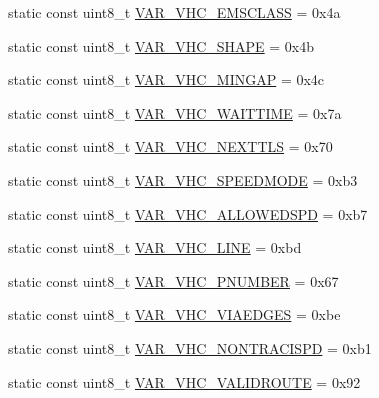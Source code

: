 \begin{DoxyCompactItemize}
\item 
static const uint8\+\_\+t \hyperlink{classtraci__api_1_1_vehicle_manager_a26f3f016ee48aa4f004058253c0699ff}{V\+A\+R\+\_\+\+V\+H\+C\+\_\+\+E\+M\+S\+C\+L\+A\+SS} = 0x4a
\item 
static const uint8\+\_\+t \hyperlink{classtraci__api_1_1_vehicle_manager_a1f99a485df0336dc0be888fe59b1431a}{V\+A\+R\+\_\+\+V\+H\+C\+\_\+\+S\+H\+A\+PE} = 0x4b
\item 
static const uint8\+\_\+t \hyperlink{classtraci__api_1_1_vehicle_manager_ad4456bf8a1da769c826274acb2af6fe9}{V\+A\+R\+\_\+\+V\+H\+C\+\_\+\+M\+I\+N\+G\+AP} = 0x4c
\item 
static const uint8\+\_\+t \hyperlink{classtraci__api_1_1_vehicle_manager_a12d27b67a1efc5a300aa7baed5cdc473}{V\+A\+R\+\_\+\+V\+H\+C\+\_\+\+W\+A\+I\+T\+T\+I\+ME} = 0x7a
\item 
static const uint8\+\_\+t \hyperlink{classtraci__api_1_1_vehicle_manager_a2c78dc01c5fdad2afb13f7f449e36813}{V\+A\+R\+\_\+\+V\+H\+C\+\_\+\+N\+E\+X\+T\+T\+LS} = 0x70
\item 
static const uint8\+\_\+t \hyperlink{classtraci__api_1_1_vehicle_manager_a240c2aecbbf2dd8e024952eae3b79365}{V\+A\+R\+\_\+\+V\+H\+C\+\_\+\+S\+P\+E\+E\+D\+M\+O\+DE} = 0xb3
\item 
static const uint8\+\_\+t \hyperlink{classtraci__api_1_1_vehicle_manager_a726376cb977fae009eca00f5550980ae}{V\+A\+R\+\_\+\+V\+H\+C\+\_\+\+A\+L\+L\+O\+W\+E\+D\+S\+PD} = 0xb7
\item 
static const uint8\+\_\+t \hyperlink{classtraci__api_1_1_vehicle_manager_a226d8c4d5cffe0ce33f5041380589c09}{V\+A\+R\+\_\+\+V\+H\+C\+\_\+\+L\+I\+NE} = 0xbd
\item 
static const uint8\+\_\+t \hyperlink{classtraci__api_1_1_vehicle_manager_a866d82a9f063497d31a0f8e2f6bc9a39}{V\+A\+R\+\_\+\+V\+H\+C\+\_\+\+P\+N\+U\+M\+B\+ER} = 0x67
\item 
static const uint8\+\_\+t \hyperlink{classtraci__api_1_1_vehicle_manager_a56136da0ffaf68882bd8dc513d37ffb2}{V\+A\+R\+\_\+\+V\+H\+C\+\_\+\+V\+I\+A\+E\+D\+G\+ES} = 0xbe
\item 
static const uint8\+\_\+t \hyperlink{classtraci__api_1_1_vehicle_manager_a2d9c7e68c0b180ff0195b6c2a2ca4fd5}{V\+A\+R\+\_\+\+V\+H\+C\+\_\+\+N\+O\+N\+T\+R\+A\+C\+I\+S\+PD} = 0xb1
\item 
static const uint8\+\_\+t \hyperlink{classtraci__api_1_1_vehicle_manager_a4c7692db776fe910195ca4da458e8965}{V\+A\+R\+\_\+\+V\+H\+C\+\_\+\+V\+A\+L\+I\+D\+R\+O\+U\+TE} = 0x92
\item 

\end{DoxyCompactItemize}
